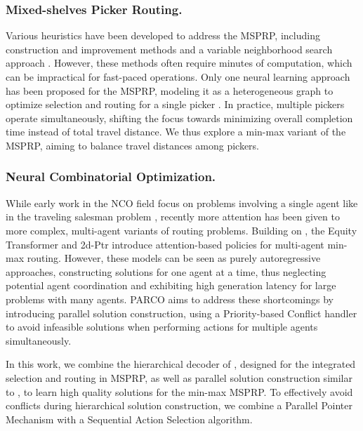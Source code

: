 
\subsubsection{Mixed-shelves Picker Routing.}
Various heuristics have been developed to address the MSPRP, including construction and improvement methods \cite{weidingerPickerRoutingRectangular2018,weidingerPickerRoutingMixedshelves2019} and a variable neighborhood search approach \cite{xie2023formulating}. However, these methods often require minutes of computation, which can be impractical for fast-paced operations.
Only one neural learning approach has been proposed for the MSPRP, modeling it as a heterogeneous graph to optimize selection and routing for a single picker \cite{luttmann2024neural}. In practice, multiple pickers operate simultaneously, shifting the focus towards minimizing overall completion time instead of total travel distance. We thus explore a min-max variant of the MSPRP, aiming to balance travel distances among pickers. 
\vspace{-5mm}

\subsubsection{Neural Combinatorial Optimization.} While early work in the NCO field focus on problems involving a single agent like in the traveling salesman problem  \cite{vinyals2015pointer,kool2018attention,kwon2020pomo,kwon2021matrix}, recently more attention has been given to more complex, multi-agent variants of routing problems. Building on \cite{kool2018attention}, the Equity Transformer \cite{son2024equity} and 2d-Ptr \cite{liu20242d} introduce attention-based policies for multi-agent min-max routing. However, these models can be seen as purely autoregressive approaches, constructing solutions for one agent at a time, thus neglecting potential agent coordination and exhibiting high generation latency for large problems with many agents. PARCO \cite{berto2024parco} aims to address these shortcomings by introducing parallel solution construction, using a Priority-based Conflict handler to avoid infeasible solutions when performing actions for multiple agents simultaneously. 

In this work, we combine the hierarchical decoder of \cite{luttmann2024neural}, designed for the integrated selection and routing in MSPRP, as well as parallel solution construction similar to \cite{berto2024parco}, to learn high quality solutions for the min-max MSPRP. To effectively avoid conflicts during hierarchical solution construction, we combine a Parallel Pointer Mechanism with a Sequential Action Selection algorithm.
